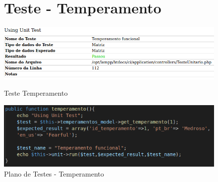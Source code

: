 \begin{apendicesenv}
\begin{figure}[!htbp]
\begin{flushleft}
    \section{Teste - Temperamento}
\end{flushleft}
    \centering
    \caption{Teste Temperamento}
    \includegraphics[width=1\textwidth,pagecommand=\chapter{}]{imagens/teste_temperamento.png}
    \label{teste-temperamento}
\end{figure}

\begin{figure}[htb]
    \centering
    \caption{\label{fig_timeline}Plano de Testes - Temperamento}
	\includegraphics[width=1\textwidth]{imagens/cod_teste_temperamento.png}
\end{figure}

\end{apendicesenv}
